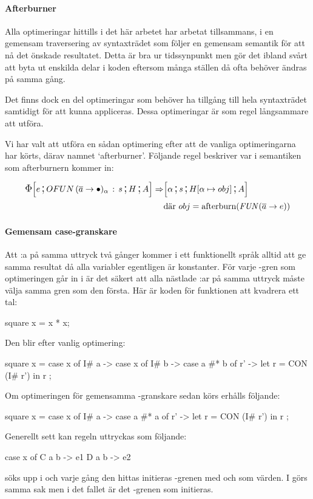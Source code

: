 \documentclass[../Optimise]{subfiles}
\begin{document}
\paragraph{Afterburner}
\label{sec:Afterburner}

Alla optimeringar hittills i det här arbetet har arbetat tillsammans, i en gemensam
traversering av syntaxträdet som följer en gemensam semantik för att nå det önskade resultatet. 
Detta är bra ur tidssynpunkt men gör det ibland svårt att byta ut enskilda delar i koden
eftersom många ställen då ofta behöver ändras på samma gång.

Det finns dock en del optimeringar som behöver ha tillgång till hela syntaxträdet
samtidigt för att kunna appliceras. Dessa optimeringar är som regel långsammare att utföra.

Vi har valt att utföra en sådan optimering efter att de vanliga
optimeringarna har körts, därav namnet `afterburner'. Följande regel beskriver
var i semantiken som afterburnern kommer in:

\begin{align*}
\CBNIRR{\cOFUN{\many{a}}{\alpha}s}HAe \Rightarrow & \CBNMC{\alpha}{s}{\heap{\alpha}{obj}}A \\
 & \text{där } obj = \text{afterburn} (\FUN{\many{a}}e)
\end{align*}

\paragraph{Gemensam case-granskare} 
Att :a på samma uttryck två gånger kommer i ett funktionellt språk alltid att ge
samma resultat då alla variabler egentligen är konstanter. För varje -gren
som optimeringen går in i är det säkert att alla nästlade :ar på samma uttryck måste välja samma
gren som den första. Här är koden för funktionen att kvadrera ett tal:

\begin{codeEx}
square x = x * x;
\end{codeEx}

Den blir efter vanlig optimering:

\begin{codeEx}
square x = case x of
            { I# a -> case x of
                { I# b -> case a #* b of
                    { r' -> let r = CON (I# r')
                            in r
            }   }   };
\end{codeEx}

Om optimeringen för gemensamma -granskare sedan körs erhålls följande:
\begin{codeEx}
square x = case x of
            { I# a -> case a #* a of
                { r' -> let r = CON (I# r')
                        in r
            }   };
\end{codeEx}

Generellt sett kan regeln uttryckas som följande:
\begin{codeEx}
case x of
    C a b -> e1
    D a b -> e2
\end{codeEx}

 söks upp i  och varje gång den hittas initieras
-grenen med  och  som värden. I  görs samma 
sak men i det fallet är det -grenen som initieras.
\end{document}
